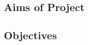 \documentclass[../CHEFCookingHelperForEveryonesFridge.tex]{subfiles}
\begin{document}
\subsection{Aims of Project}

\subsection{Objectives}
\end{document}
